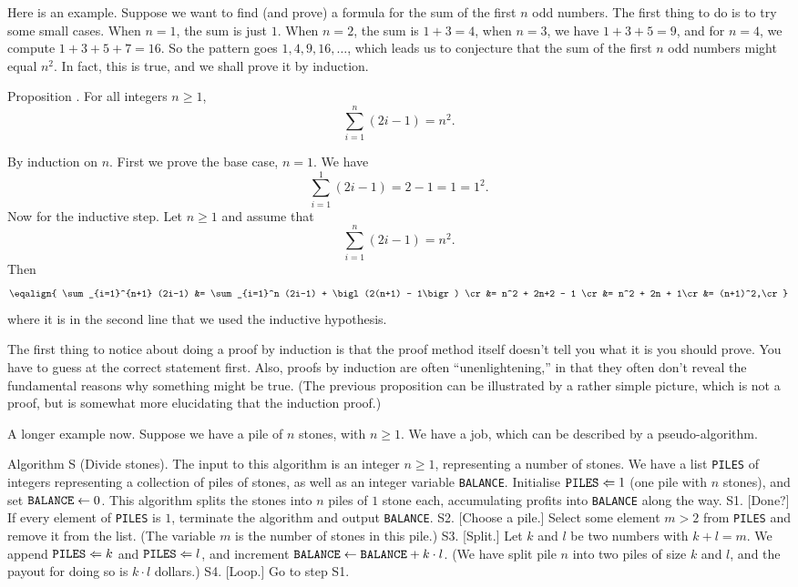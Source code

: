 Here is an example. Suppose we want to find (and prove) a formula for the sum of the first $n$ odd numbers.
The first thing to do is to try some small cases. When $n = 1$, the sum is just $1$. When $n=2$,
the sum is $1+3 = 4$, when $n=3$, we have $1+3+5 = 9$, and for $n=4$, we compute $1+3+5+7 = 16$.
So the pattern goes $1,4,9,16,\ldots$, which leads us to conjecture that the sum of the first $n$
odd numbers might equal $n^2$. In fact, this is true, and we shall prove it by induction.

\proclaim Proposition \advthm. For all integers $n\ge 1$,
$$\sum_{i=1}^n (2i-1) = n^2.$$

\proof By induction on $n$. First we prove the base case, $n=1$. We have
$$\sum_{i=1}^1 (2i-1) = 2-1 = 1 = 1^2.$$
Now for the inductive step. Let $n\ge 1$ and assume that
$$ \sum_{i=1}^n (2i-1) = n^2.$$
Then
$$\eqalign{
\sum_{i=1}^{n+1} (2i-1) &= \sum_{i=1}^n (2i-1) + \bigl(2(n+1) - 1\bigr) \cr
&= n^2 + 2n+2 - 1 \cr
&= n^2 + 2n + 1\cr
&= (n+1)^2,\cr
}$$
where it is in the second line that we used the inductive hypothesis.\slug

The first thing to notice about doing a proof by induction is that the proof method itself doesn't
tell you what it is you should prove. You have to guess at the correct statement first. Also,
proofs by induction are often ``unenlightening,'' in that they often don't reveal the fundamental reasons
why something might be true. (The previous proposition can be illustrated by a rather simple
picture, which is not a proof, but is somewhat more elucidating that the induction proof.)

A longer example now. Suppose we have a pile of $n$ stones, with $n\ge 1$. We have a job, which
can be described by a pseudo-algorithm.

\algbegin Algorithm S (Divide stones). The input to
this algorithm is an integer $n\ge 1$, representing a number of stones.
We have a list {\tt PILES} of integers representing a collection
of piles of stones, as well as an integer variable {\tt BALANCE}.
Initialise ${\tt PILES} \Leftarrow 1$ (one pile with $n$ stones), and set ${\tt BALANCE}\gets 0$.
This algorithm splits the stones into $n$ piles of $1$ stone each, accumulating profits
into {\tt BALANCE} along the way.
\algstep S1. [Done?] If every element of {\tt PILES} is $1$, terminate the algorithm and output
{\tt BALANCE}.
\algstep S2. [Choose a pile.] Select some element $m>2$
from {\tt PILES} and remove it from the list. (The variable $m$ is the number of stones in this pile.)
\algstep S3. [Split.] Let $k$ and $l$ be two numbers with $k+l = m$. We append ${\tt PILES}\Leftarrow k$ and
${\tt PILES} \Leftarrow l$, and increment ${\tt BALANCE} \gets {\tt BALANCE} + k\cdot l$. (We have split
pile $n$ into two piles of size $k$ and $l$, and the payout for doing so is $k\cdot l$ dollars.)
\algstep S4. [Loop.] Go to step S1.\slug

